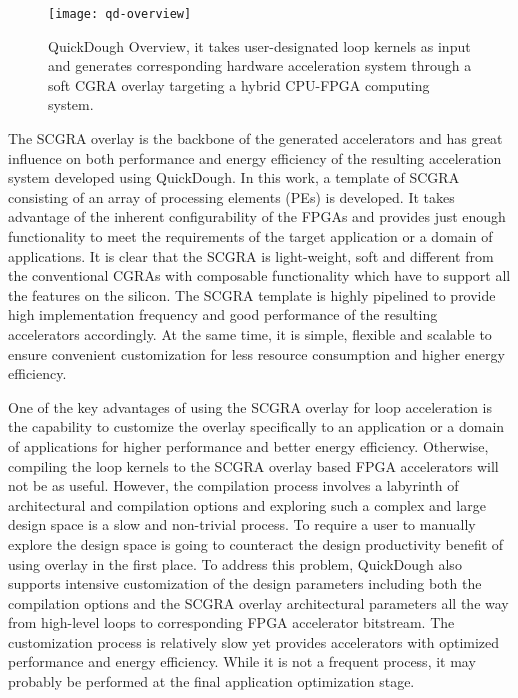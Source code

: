 \begin{figure}
\centering
\texttt{[image: qd-overview]}
\caption{QuickDough Overview, it takes user-designated loop kernels as input and generates corresponding hardware acceleration system through a soft CGRA overlay targeting a hybrid CPU-FPGA computing system.}
\label{fig:qd-overview}
\end{figure}

The SCGRA overlay is the backbone of the generated accelerators and has great influence on both performance and energy efficiency of the resulting acceleration system developed using QuickDough. In this work, a template of SCGRA consisting of an array of processing elements (PEs) is developed. It takes advantage of the inherent configurability of the FPGAs and provides just enough functionality to meet the requirements of the target application or a domain of applications. It is clear that the SCGRA is light-weight, soft and different from the conventional CGRAs with composable functionality which have to support all the features on the silicon. The SCGRA template is highly pipelined to provide high implementation frequency and good performance of the resulting accelerators accordingly. At the same time, it is simple, flexible and scalable to ensure convenient customization for less resource consumption and higher energy efficiency. 

One of the key advantages of using the SCGRA overlay for loop acceleration is the capability to customize the overlay specifically to an application or a domain of applications for higher performance and better energy efficiency. Otherwise, compiling the loop kernels to the SCGRA overlay based FPGA accelerators will not be as useful. However, the compilation process involves a labyrinth of architectural and compilation options and exploring such a complex and large design space is a slow and non-trivial process. To require a user to manually explore the design space is going to counteract the design productivity benefit of using overlay in the first place. To address this problem, QuickDough also supports intensive customization of the design parameters including both the compilation options and the SCGRA overlay architectural parameters all the way from high-level loops to corresponding FPGA accelerator bitstream. The customization process is relatively slow yet provides accelerators with optimized performance and energy efficiency. While it is not a frequent process, it may probably be performed at the final application optimization stage.

